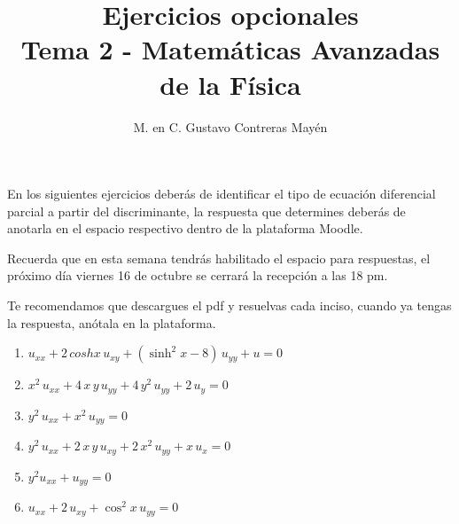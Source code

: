 
\usepackage{apacite}
\title{Ejercicios opcionales \\[0.3em]  \large{Tema 2 - Matemáticas Avanzadas de la Física}\vspace{-3ex}}
\author{M. en C. Gustavo Contreras Mayén}
\date{ }

\vspace{-4cm}
\maketitle
\fontsize{14}{14}\selectfont
En los siguientes ejercicios deberás de identificar el tipo de ecuación diferencial parcial a partir del discriminante, la respuesta que determines deberás de anotarla en el espacio respectivo dentro de la plataforma Moodle.
\par
Recuerda que en esta semana tendrás habilitado el espacio para respuestas, el próximo día viernes 16 de octubre se cerrará la recepción a las 18 pm.
\par
Te recomendamos que descargues el pdf y resuelvas cada inciso, cuando ya tengas la respuesta, anótala en la plataforma.
\begin{enumerate}
\item $u_{xx} +  2 \, cosh x \, u_{xy} + (\sinh^{2} x - 8) \, u_{yy} + u = 0$
\item $x^{2} \, u_{xx} + 4 \, x \, y \, u_{yy} + 4 \, y^{2} \, u_{yy} + 2 \, u_{y} = 0$
\item $y^{2} \, u_{xx} + x^{2} \, u_{yy} = 0$
\item $y^{2} \, u_{xx} + 2 \, x \, y \, u_{xy} + 2 \, x^{2} \, u_{yy} + x \, u_{x} = 0$
\item $y^{2} u_{xx} + u_{yy} = 0$
\item $u_{xx} + 2 \, u_{xy} + \cos^{2} x \, u_{yy} = 0$
\end{enumerate}
